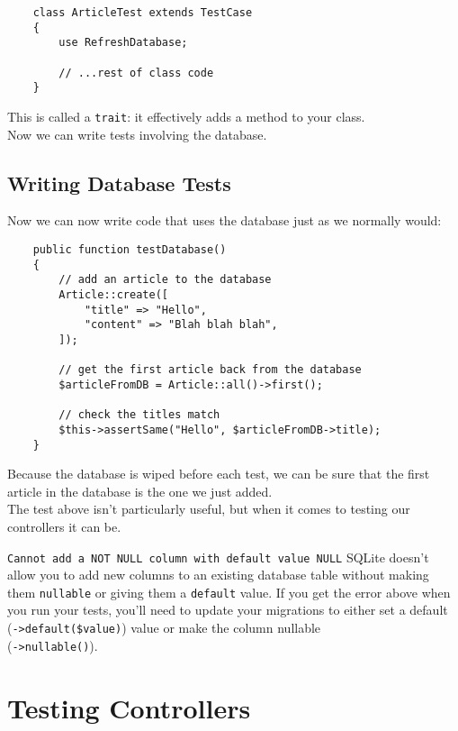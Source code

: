 \begin{verbatim}
    class ArticleTest extends TestCase
    {
        use RefreshDatabase;

        // ...rest of class code
    }
\end{verbatim}

This is called a \texttt{trait}: it effectively adds a method to your class.
\\

Now we can write tests involving the database.


\subsection{Writing Database Tests}

Now we can now write code that uses the database just as we normally would:

\begin{verbatim}
    public function testDatabase()
    {
        // add an article to the database
        Article::create([
            "title" => "Hello",
            "content" => "Blah blah blah",
        ]);

        // get the first article back from the database
        $articleFromDB = Article::all()->first();

        // check the titles match
        $this->assertSame("Hello", $articleFromDB->title);
    }
\end{verbatim}

Because the database is wiped before each test, we can be sure that the first article in the database is the one we just added.
\\

The test above isn't particularly useful, but when it comes to testing our controllers it can be.

\begin{infobox}{\texttt{Cannot add a NOT NULL column with default value NULL}}
    SQLite doesn't allow you to add new columns to an existing database table without making them \texttt{nullable} or giving them a \texttt{default} value. If you get the error above when you run your tests, you'll need to update your migrations to either set a default (\texttt{->default(\$value)}) value or make the column nullable \\ (\texttt{->nullable()}).
\end{infobox}



\section{Testing Controllers}

